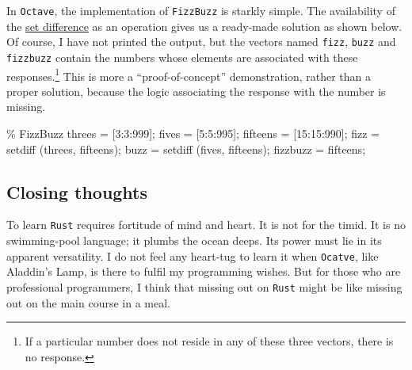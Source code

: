 \documentclass[
  a4paper,
]{article}
\newenvironment{Shaded}{\begin{snugshade}}{\end{snugshade}}
\newcommand{\CommentTok}[1]{\textcolor[rgb]{0.50,0.62,0.50}{#1}}
\newcommand{\FloatTok}[1]{\textcolor[rgb]{0.75,0.75,0.82}{#1}}
\newcommand{\FunctionTok}[1]{\textcolor[rgb]{0.94,0.94,0.56}{#1}}
\newcommand{\NormalTok}[1]{\textcolor[rgb]{0.80,0.80,0.80}{#1}}
\newcommand{\OperatorTok}[1]{\textcolor[rgb]{0.94,0.94,0.82}{#1}}
\begin{document}
In \texttt{Octave}, the implementation of \texttt{FizzBuzz} is starkly
simple. The availability of the
\href{https://en.wikipedia.org/wiki/Complement_(set_theory)\#Relative_complement}{set
difference} as an operation gives us a ready-made solution as shown
below. Of course, I have not printed the output, but the vectors named
\texttt{fizz}, \texttt{buzz} and \texttt{fizzbuzz} contain the numbers
whose elements are associated with these responses.\footnote{If a
  particular number does not reside in any of these three vectors, there
  is no response.} This is more a ``proof-of-concept'' demonstration,
rather than a proper solution, because the logic associating the
response with the number is missing.

\begin{Shaded}
\begin{Highlighting}[]
\CommentTok{\% FizzBuzz}
\NormalTok{threes }\OperatorTok{=}\NormalTok{ [}\FloatTok{3}\OperatorTok{:}\FloatTok{3}\OperatorTok{:}\FloatTok{999}\NormalTok{]}\OperatorTok{;}
\NormalTok{fives }\OperatorTok{=}\NormalTok{ [}\FloatTok{5}\OperatorTok{:}\FloatTok{5}\OperatorTok{:}\FloatTok{995}\NormalTok{]}\OperatorTok{;}
\NormalTok{fifteens }\OperatorTok{=}\NormalTok{ [}\FloatTok{15}\OperatorTok{:}\FloatTok{15}\OperatorTok{:}\FloatTok{990}\NormalTok{]}\OperatorTok{;}
\NormalTok{fizz }\OperatorTok{=} \FunctionTok{setdiff}\NormalTok{ (threes}\OperatorTok{,}\NormalTok{ fifteens)}\OperatorTok{;}
\NormalTok{buzz }\OperatorTok{=} \FunctionTok{setdiff}\NormalTok{ (fives}\OperatorTok{,}\NormalTok{ fifteens)}\OperatorTok{;}
\NormalTok{fizzbuzz }\OperatorTok{=}\NormalTok{ fifteens}\OperatorTok{;}
\end{Highlighting}
\end{Shaded}

\hypertarget{closing-thoughts}{%
\subsection{Closing thoughts}\label{closing-thoughts}}

To learn \texttt{Rust} requires fortitude of mind and heart. It is not
for the timid. It is no swimming-pool language; it plumbs the ocean
deeps. Its power must lie in its apparent versatility. I do not feel any
heart-tug to learn it when \texttt{Ocatve}, like Aladdin's Lamp, is
there to fulfil my programming wishes. But for those who are
professional programmers, I think that missing out on \texttt{Rust}
might be like missing out on the main course in a meal.
\end{document}
